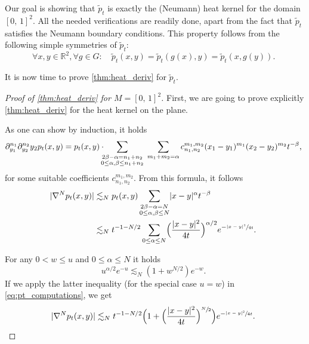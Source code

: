 \documentclass[JEP,XML,SOM,Unicode]{cedram}
\theoremstyle{plain}
\theoremstyle{definition}
\numberwithin{equation}{section}
\newcommand{\RR}{\ensuremath{\mathbb R}}
\newcommand{\cc}[2]{\ensuremath{\left[#1,\,#2\right]}}
\renewcommand{\comma}{\ensuremath{\text{, }}}
\newcommand{\comma}{\ensuremath{\text{, }}}
\newcommand{\fullstop}{\ensuremath{\text{. }}}
\DeclarePairedDelimiter\abs{\lvert}{\rvert}
\begin{document}
Our goal is showing that $\tilde p_t$ is exactly the (Neumann) heat kernel for the domain $\cc01^2$.
All the needed verifications are readily done, apart from the fact that $\tilde p_t$
satisfies the Neumann boundary conditions.
This property follows from the following simple symmetries of $\tilde p_t$:
\begin{equation*}
\forall x, y\in\RR^2, \forall g\in G: \quad
\tilde p_t(x, y) = \tilde p_t(g(x), y) = \tilde p_t(x, g(y)) \fullstop
\end{equation*}

It is now time to prove \cref{thm:heat_deriv} for $\tilde p_t$.
\begin{proof}[Proof of \cref{thm:heat_deriv} for $M=\cc01^2$]
First, we are going to prove explicitly \cref{thm:heat_deriv} for the heat kernel on the plane.

As one can show by induction, it holds
\begin{equation*}
\partial^{n_1}_{y_1}\partial_{y_2}^{n_2}{y_2} p_t(x,y) = p_t(x,y) \cdot\hspace*{-2mm}
\sum_{\substack{2\beta-\alpha=n_1+n_2 \\ 0\le \alpha,\beta\le n_1+n_2}}\hspace*{1mm}
\sum_{m_1+m_2 = \alpha} c_{n_1,n_2}^{m_1,m_2}(x_1-y_1)^{m_1}(x_2-y_2)^{m_2}t^{-\beta} \comma
\end{equation*}
for some suitable coefficients $c_{n_1,n_2}^{m_1,m_2}$. From this formula, it follows
\begin{gather}\begin{split}\label{eq:pt_computations}
\abs{\nabla^N p_t(x, y)}
&\lesssim_N p_t(x, y)\sum_{\substack{2\beta-\alpha=N \\ 0\le \alpha,\beta\le N}}
\abs{x-y}^\alpha t^{-\beta} \\
&\lesssim_N t^{-1-N/2}\sum_{0\le\alpha\le N}
\Bigl(\frac{\abs{x-y}^2}{4t}\Bigr)^{\alpha/2}e^{-\sfrac{\abs{x-y}^2}{4t}}\fullstop
\end{split}\end{gather}

For any $0<w\le u$ and
$0\le\alpha\le N$ it holds
\begin{equation}\label{eq:elementary_ineq}
u^{\alpha/2}e^{-u}\lesssim_N (1+w^{N/2})e^{-w} \fullstop
\end{equation}
If we apply the latter inequality (for the special case $u=w$) in \cref{eq:pt_computations}, we get
\begin{equation}\label{eq:pt_deriv}
\abs{\nabla^N p_t(x, y)}
\lesssim_N t^{-1-N/2}\Bigl(1
	 + \Bigl(\frac{\abs{x-y}^2}{4t}\Bigr)^{\sfrac N2}\Bigr) e^{-\sfrac{\abs{x-y}^2}{4t}} \fullstop
\end{equation}


\end{proof}
\end{document}
